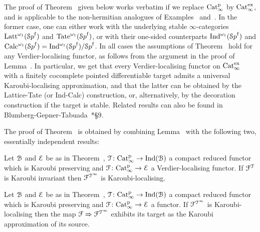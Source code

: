 




\begin{remark}
The proof of Theorem~ given below works verbatim if we replace $\mathrm{Cat}^{\mathrm p}_\infty$ by $\mathrm{Cat}_\infty^{\mathrm{ex}}$, and is applicable to the non-hermitian analogues of Examples~ and~. In the former case, one can either work with the underlying stable $\infty$-categories $\operatorname{Latt}^{\omega_1}({\mathcal Sp}^{\mathrm{f}})$ and $\operatorname{Tate}^{\omega_1}({\mathcal Sp}^{\mathrm{f}})$, or with their one-sided counterparts $\operatorname{Ind}^{\omega_1}({\mathcal Sp}^{\mathrm{f}})$ and $\mathrm{Calc}^{\omega_1}({\mathcal Sp}^{\mathrm{f}}) = \operatorname{Ind}^{\omega_1}({\mathcal Sp}^{\mathrm{f}})/{\mathcal Sp}^{\mathrm{f}}$. In all cases the assumptions of Theorem~ hold for any Verdier-localising functor, as follows from the argument in the proof of Lemma~.
In particular, we get that every Verdier-localising functor on $\mathrm{Cat}_\infty^{\mathrm{ex}}$ with a finitely cocomplete pointed differentiable target admits a universal Karoubi-localising approximation, and that the latter can be obtained by the Lattice-Tate (or Ind-Calc) construction, or, alternatively, by the decoration construction if the target is stable. 
Related results can also be found in Blumberg-Gepner-Tabuada~\cite{BGT}*{\S 9}.
\end{remark}


The proof of Theorem~ is obtained by combining Lemma~ with the following two, essentially independent results:

\begin{proposition}
\label{proposition:is-karoubi}%
Let $\mathcal{B}$ and $\mathcal{E}$ be as in Theorem~, $\mathcal{T}\colon \mathrm{Cat}^{\mathrm p}_\infty \to \operatorname{Ind}(\mathcal{B})$ a compact reduced functor which is Karoubi preserving and $\mathcal{F}\colon \mathrm{Cat}^{\mathrm p}_\infty \to \mathcal{E}$ a Verdier-localising functor.
If $\mathcal{F}^{\mathcal{T}}$ is Karoubi invariant then $\mathcal{F}^{\mathcal{T}^{\infty}}$ is Karoubi-localising.
\end{proposition}

\begin{proposition}
\label{proposition:is-universal}%
Let $\mathcal{B}$ and $\mathcal{E}$ be as in Theorem~, $\mathcal{T}\colon \mathrm{Cat}^{\mathrm p}_\infty \to \operatorname{Ind}(\mathcal{B})$ a compact reduced functor which is Karoubi preserving and $\mathcal{F}\colon \mathrm{Cat}^{\mathrm p}_\infty \to \mathcal{E}$ a functor.
If $\mathcal{F}^{\mathcal{T}^{\infty}}$ is Karoubi-localising then the map $\mathcal{F} \Rightarrow \mathcal{F}^{\mathcal{T}^{\infty}}$ exhibits its target as the Karoubi approximation of its source.
\end{proposition}


